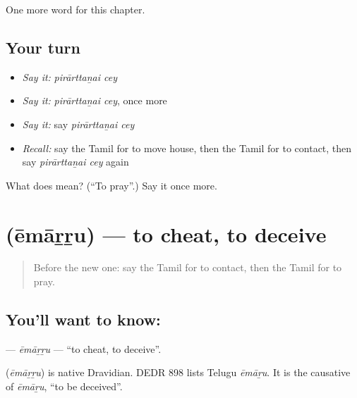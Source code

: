 \begin{grammarlens}[title={What you've built}]
One more word for this chapter.
\end{grammarlens}

\subsection*{Your turn}
\begin{itemize}
\raggedright
  \item \emph{Say it:} \emph{pirārttaṉai cey}
  \item \emph{Say it:} \emph{pirārttaṉai cey}, once more
  \item \emph{Say it:} say \emph{pirārttaṉai cey}
  \item \emph{Recall:} say the Tamil for to move house, then the Tamil for to contact, then say \emph{pirārttaṉai cey} again
\end{itemize}

\begin{tcolorbox}[breakable,colback=teal!4,colframe=teal!35!black,title={Before you move on}]
What does   mean? (\textquotedblleft{}To pray\textquotedblright{}.) Say it once more.
\end{tcolorbox}
\section[\texorpdfstring{\ta{ஏமாற்று} (ēmāṟṟu)}{ஏமாற்று (ēmāṟṟu)}]{ (ēmāṟṟu) — to cheat, to deceive}

\label{lesson:TA-C198-emarru}



\begin{quote}
Before the new one: say the Tamil for to contact, then the Tamil for to pray.
\end{quote}

\subsection*{You'll want to know: }
\textbf{} — \emph{ēmāṟṟu} — \textquotedblleft{}to cheat, to deceive\textquotedblright{}.

\begin{cousinweb}
\textbf{} (\emph{ēmāṟṟu}) is native Dravidian. DEDR 898 lists Telugu \emph{ēmāṟu}. It is the causative of \emph{ēmāṟu}, \textquotedblleft{}to be deceived\textquotedblright{}.
\end{cousinweb}

